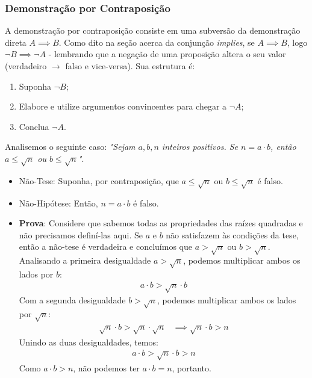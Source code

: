 \documentclass[13pt,letterpaper]{article}
\begin{document}
\subsubsection{Demonstração por Contraposição}
A demonstração por contraposição consiste em uma subversão da demonstração direta $A \implies B$. Como dito na seção acerca da conjunção \emph{implies}, se $A \implies B$, logo $\lnot B \implies \lnot A$ - lembrando que a negação de uma proposição altera o seu valor (verdadeiro $\rightarrow$ falso e vice-versa).
Sua estrutura é:
\begin{enumerate}
    \item Suponha $\lnot B$;
    \item Elabore e utilize argumentos convincentes para chegar a $\lnot A$;
    \item Conclua $\lnot A$.
\end{enumerate}
Analisemos o seguinte caso: \emph{"Sejam $a, b, n$ inteiros positivos. Se $n = a \cdot b$, então $ a \leq \sqrt{n}$ ou $b \leq \sqrt{n}$"}.
\begin{itemize}
    \item Não-Tese: Suponha, por contraposição, que $a \leq \sqrt{n}$ ou $b \leq \sqrt{n}$ é falso.
    \item Não-Hipótese: Então, $n = a \cdot b$ é falso.
    \item \textbf{Prova}: Considere que sabemos todas as propriedades das raízes quadradas e não precisamos definí-las aqui. Se $a$ e $b$ não satisfazem às condições da tese, então a não-tese é verdadeira e concluímos que $a > \sqrt{n}$ ou $b > \sqrt{n}$. Analisando a primeira desigualdade $a > \sqrt{n}$, podemos multiplicar ambos os lados por $b$:
    \begin{align*}
        a \cdot b > \sqrt{n} \cdot b
    \end{align*}
    Com a segunda desigualdade $b > \sqrt{n}$, podemos multiplicar ambos os lados por $\sqrt{n}$:
    \begin{align*}
        \sqrt{n} \cdot b > \sqrt{n} \cdot \sqrt{n} &\implies
        \sqrt{n} \cdot b > n
    \end{align*}
    Unindo as duas desigualdades, temos:
    \begin{align*}
        a \cdot b > \sqrt{n} \cdot b > n
    \end{align*}
   Como $a \cdot b > n$, não podemos ter $a \cdot b = n$, portanto.
    
\end{itemize}
\end{document}
